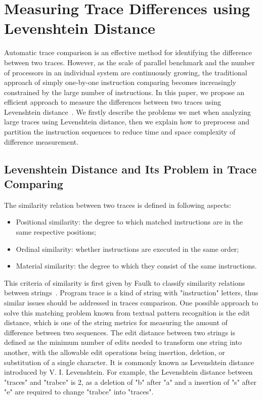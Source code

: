 \documentclass[10pt,journal,cspaper,compsoc]{IEEEtran}
\begin{document}
\section{Measuring Trace Differences using Levenshtein Distance}
Automatic trace comparison is an effective method for identifying
the difference between two traces. However, as the scale of parallel
benchmark and the number of processors in an individual system
are continuously growing, the traditional approach of simply
one-by-one instruction comparing becomes increasingly constrained by
the large number of instructions. In this paper, we propose an
efficient approach to measure the differences between two traces
using Levenshtein distance~\cite{ld1996}. We firstly describe the
problems we met when analyzing large traces using Levenshtein
distance, then we explain how to preprocess and partition the
instruction sequences to reduce time and space complexity of
difference measurement.

\subsection{Levenshtein Distance and Its Problem in Trace Comparing}

The similarity relation between two traces is defined in following
aspects:
\begin{itemize}
  \item Positional similarity: the degree to which matched instructions are in the same
respective positions;
  \item Ordinal similarity: whether instructions are executed in the same order;
  \item Material similarity: the degree to which they consist of the same
  instructions.
\end{itemize}

This criteria of similarity is first given by Faulk to classify
similarity relations between strings~\cite{Faulk1964}. Program trace
is a kind of string with "instruction" letters, thus similar issues
should be addressed in traces comparison. One possible approach to
solve this matching problem known from textual pattern recognition
is the edit distance, which is one of the string metrics for
measuring the amount of difference between two sequences. The edit
distance between two strings is defined as the minimum number of
edits needed to transform one string into another, with the
allowable edit operations being insertion, deletion, or substitution
of a single character. It is commonly known as Levenshtein
distance~\cite{distance66} introduced by V. I. Levenshtein. For
example, the Levenshtein distance between "traces" and "trabce" is
2, as a deletion of "b" after "a" and a insertion of "s" after "e"
are required to change "trabce" into "traces".
\end{document}
